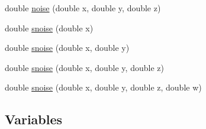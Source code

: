 \begin{DoxyCompactItemize}
double \hyperlink{namespacecprocessing_a12c5c480ee409902975902ee93e7f6f1}{noise} (double x, double y, double z)
\item 
double \hyperlink{namespacecprocessing_a4e17576d2a90714ee8674267ec110818}{snoise} (double x)
\item 
double \hyperlink{namespacecprocessing_a3e3ddf4e0b20ef72ba96024ba642ae82}{snoise} (double x, double y)
\item 
double \hyperlink{namespacecprocessing_a6e08520154ed9955742b56be9d67d2f8}{snoise} (double x, double y, double z)
\item 
double \hyperlink{namespacecprocessing_a1eff9b8a49a4447c4b7b9c8fe8b70cb0}{snoise} (double x, double y, double z, double w)
\end{DoxyCompactItemize}
\subsection*{\-Variables}
